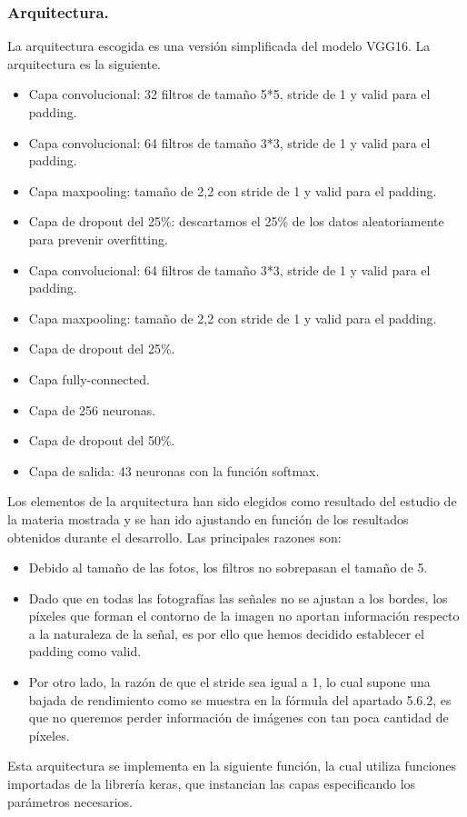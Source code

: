 \documentclass[a4paper,11pt]{article}
\begin{document}
\subsubsection{Arquitectura.}
La arquitectura escogida es una versión simplificada del modelo VGG16. La arquitectura es la siguiente.
\begin{itemize}
\item Capa convolucional: 32 filtros de tamaño 5*5, stride de 1 y valid para el padding.
\item Capa convolucional: 64 filtros de tamaño 3*3, stride de 1 y valid para el padding.
\item Capa maxpooling: tamaño de 2,2 con stride de 1 y valid para el padding.
\item Capa de dropout del 25\%: descartamos el 25\% de los datos aleatoriamente para prevenir overfitting.
\item Capa convolucional: 64 filtros de tamaño 3*3, stride de 1 y valid para el padding.
\item Capa maxpooling: tamaño de 2,2 con stride de 1 y valid para el padding.
\item Capa de dropout del 25\%.
\item Capa fully-connected.
\item Capa de 256 neuronas.
\item Capa de dropout del 50\%.
\item Capa de salida: 43 neuronas con la función softmax.
\end{itemize}
Los elementos de la arquitectura han sido elegidos como resultado del estudio de la materia mostrada y se han ido ajustando en función de los resultados obtenidos durante el desarrollo. Las principales razones son:
\begin{itemize}
\item Debido al tamaño de las fotos, los filtros no sobrepasan el tamaño de 5. 
\item Dado que en todas las fotografías las señales no se ajustan a los bordes, los píxeles que forman el contorno de la imagen no aportan información respecto a la naturaleza de la señal, es por ello que hemos decidido establecer el padding como valid.
\item Por otro lado, la razón de que el stride sea igual a 1, lo cual supone una bajada de rendimiento como se muestra en la fórmula del apartado 5.6.2, es que no queremos perder información de imágenes con tan poca cantidad de píxeles.
\end{itemize}
\noindent
Esta arquitectura se implementa en la siguiente función, la cual utiliza funciones importadas de la librería keras, que instancian las capas especificando los parámetros necesarios.
\end{document}
